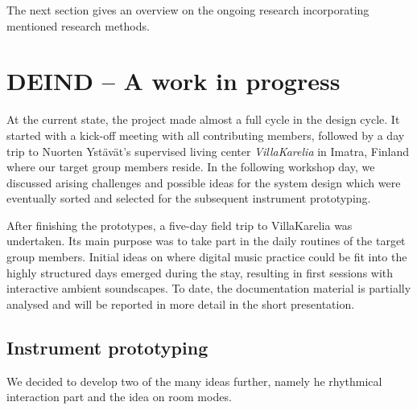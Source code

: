\documentclass{chi-ext}
\begin{document}
\begin{multicols}{2}
The next section gives an overview on the ongoing research incorporating mentioned research methods.

\section{DEIND – A work in progress}
\label{sec:progress}

At the current state, the project made almost a full cycle in the design cycle.
It started with a kick-off meeting with all contributing members, followed  by a day trip to Nuorten Ystävät's supervised living center \emph{VillaKarelia} in Imatra, Finland where our target group members reside.
In the following workshop day, we discussed arising challenges and possible ideas for the system design which were eventually sorted and selected for the subsequent instrument prototyping. 

After finishing the prototypes, a five-day field trip to VillaKarelia was undertaken. 
Its main purpose was to take part in the daily routines of the target group members.
Initial ideas on where digital music practice could be fit into the highly structured days emerged during the stay, resulting in first sessions with interactive ambient soundscapes.
To date, the documentation material is partially analysed and will be reported in more detail in the short presentation. 



\subsection{Instrument prototyping}
\label{sec:instrument_prototyping}

We decided to develop two of the many ideas further, namely he rhythmical interaction part and the idea on room modes.


\end{multicols}
\end{document}
